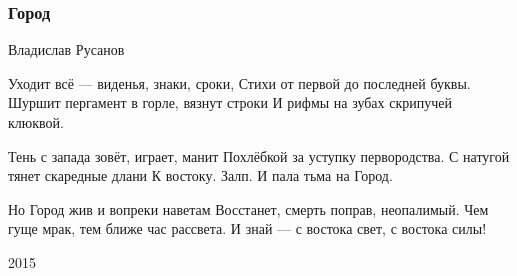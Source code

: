  
 
 

\subsubsection{Город}

Владислав Русанов

Уходит всё — виденья, знаки, сроки,
Стихи от первой до последней буквы.
Шуршит пергамент в горле, вязнут строки
И рифмы на зубах скрипучей клюквой.

Тень с запада зовёт, играет, манит
Похлёбкой за уступку первородства.
С натугой тянет скаредные длани
К востоку. Залп. И пала тьма на Город.

Но Город жив и вопреки наветам
Восстанет, смерть поправ, неопалимый.
Чем гуще мрак, тем ближе час рассвета.
И знай — с востока свет, с востока силы!

2015 

